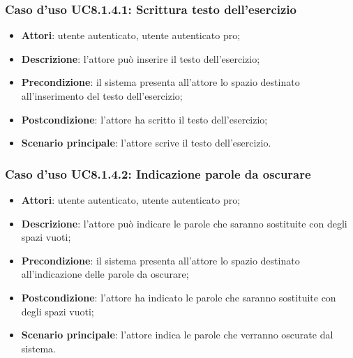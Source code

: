 \subsubsection{Caso d'uso UC8.1.4.1: Scrittura testo dell'esercizio}
	\begin{itemize}
		\item
			\textbf{Attori}: utente autenticato, utente autenticato pro;
		\item		
			\textbf{Descrizione}: l'attore può inserire il testo dell'esercizio;
		\item
			\textbf{Precondizione}: il sistema presenta all'attore lo spazio destinato all'inserimento del testo dell'esercizio; 
		\item
			\textbf{Postcondizione}: l'attore ha scritto il testo dell'esercizio;
		\item
			\textbf{Scenario principale}: l'attore scrive il testo dell'esercizio.
	\end{itemize}


\subsubsection{Caso d'uso UC8.1.4.2: Indicazione parole da oscurare}
	\begin{itemize}
		\item
			\textbf{Attori}: utente autenticato, utente autenticato pro;
		\item		
			\textbf{Descrizione}: l'attore può indicare le parole che saranno sostituite con degli spazi vuoti;
		\item
			\textbf{Precondizione}: il sistema presenta all'attore lo spazio destinato all'indicazione delle parole da oscurare;  
		\item
			\textbf{Postcondizione}: l'attore ha indicato le parole che saranno sostituite con degli spazi vuoti;
		\item
			\textbf{Scenario principale}: l'attore indica le parole che verranno oscurate dal sistema.
	\end{itemize}